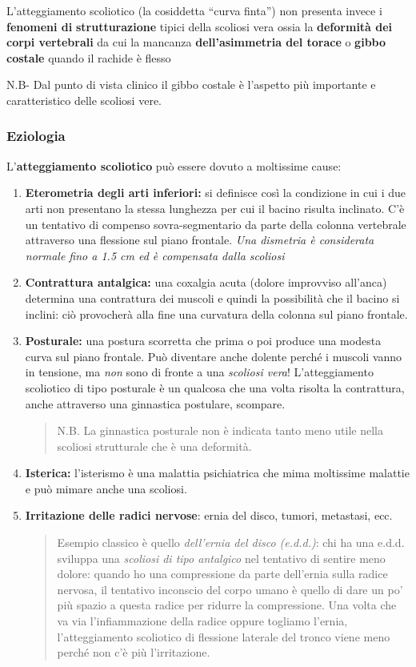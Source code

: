 L'atteggiamento scoliotico (la cosiddetta ``curva finta'') non presenta
invece i \textbf{fenomeni di} \textbf{strutturazione} tipici della
scoliosi vera ossia la \textbf{deformità dei corpi vertebrali} da cui la
mancanza \textbf{dell'asimmetria del torace} o \textbf{gibbo costale}
quando il rachide è flesso

N.B- Dal punto di vista clinico il gibbo costale è l'aspetto più
importante e caratteristico delle scoliosi vere.

\subsubsection{Eziologia}


L'\textbf{atteggiamento scoliotico} può essere dovuto a moltissime
cause:

\begin{enumerate}
\def\labelenumi{\arabic{enumi}.}
\item
  \textbf{Eterometria degli arti inferiori:} si definisce così la
  condizione in cui i due arti non presentano la stessa lunghezza per
  cui il bacino risulta inclinato. C'è un tentativo di compenso
  sovra-segmentario da parte della colonna vertebrale attraverso una
  flessione sul piano frontale. \emph{Una dismetria è considerata
  normale fino a 1.5 cm ed è compensata dalla scoliosi}
\item
  \textbf{Contrattura antalgica:} una coxalgia acuta (dolore improvviso
  all'anca) determina una contrattura dei muscoli e quindi la
  possibilità che il bacino si inclini: ciò provocherà alla fine una
  curvatura della colonna sul piano frontale.
\item
  \textbf{Posturale:} una postura scorretta che prima o poi produce una
  modesta curva sul piano frontale. Può diventare anche dolente perché i
  muscoli vanno in tensione, ma \emph{non} sono di fronte a una
  \emph{scoliosi vera}! L'atteggiamento scoliotico di tipo posturale è
  un qualcosa che una volta risolta la contrattura, anche attraverso una
  ginnastica postulare, scompare.
\begin{quote}
N.B. La ginnastica posturale non è indicata tanto meno utile nella
scoliosi strutturale che è una deformità.
\end{quote}
\item
  \textbf{Isterica:} l'isterismo è una malattia psichiatrica che mima
  moltissime malattie e può mimare anche una scoliosi.
\item
  \textbf{Irritazione delle radici nervose}: ernia del disco, tumori,
  metastasi, ecc.
\begin{quote}
Esempio classico è quello \emph{dell'ernia del disco (e.d.d.)}: chi ha
una e.d.d. sviluppa una \emph{scoliosi di tipo antalgico} nel tentativo
di sentire meno dolore: quando ho una compressione da parte dell'ernia
sulla radice nervosa, il tentativo inconscio del corpo umano è quello di
dare un po' più spazio a questa radice per ridurre la compressione. Una
volta che va via l'infiammazione della radice oppure togliamo l'ernia,
l'atteggiamento scoliotico di flessione laterale del tronco viene meno
perché non c'è più l'irritazione.


\end{quote}
\end{enumerate}
